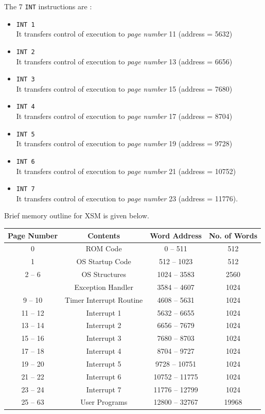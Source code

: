 \documentclass[11pt]{report}
\begin{document}
The 7 \texttt{INT} instructions are :
\begin{itemize}

\item \texttt{INT 1}  \\It transfers control of execution to \textit{page number} 11 (address = 5632)
\item \texttt{INT 2}  \\It transfers control of execution to \textit{page number} 13 (address = 6656)
\item \texttt{INT 3}  \\It transfers control of execution to \textit{page number} 15 (address = 7680)
\item \texttt{INT 4}  \\It transfers control of execution to \textit{page number} 17 (address = 8704)
\item \texttt{INT 5}  \\It transfers control of execution to \textit{page number} 19 (address = 9728)
\item \texttt{INT 6}  \\It transfers control of execution to \textit{page number}  21 (address = 10752)
\item \texttt{INT 7}  \\It transfers control of execution to \textit{page number} 23 (address = 11776).\
 
\end{itemize}

Brief memory outline for XSM is given below.
\begin{center}
\begin{tabular}{|c|c|c|c|}
\hline \textbf{Page Number} & \textbf{Contents} & \textbf{Word Address}  & \textbf{No. of Words} \\ 
\hline 0 & ROM Code &  0 -- 511 & 512 \\ 
1 & OS Startup Code & 512 -- 1023 & 512 \\ 
2 -- 6 & OS Structures  &  1024 -- 3583 & 2560 \\ 
 \rowcolor{gray!15}
\hline 7 & Exception Handler  &  3584 -- 4607 & 1024 \\ 
 \rowcolor{gray!15}
 9 -- 10 & Timer Interrupt Routine  &  4608 -- 5631 & 1024 \\ 
 \rowcolor{gray!15}
 11 -- 12 & Interrupt 1  &  5632 -- 6655 & 1024 \\ 
 \rowcolor{gray!15}
13 -- 14 & Interrupt 2  &  6656 -- 7679 & 1024 \\ 
 \rowcolor{gray!15}
 15 -- 16 & Interrupt 3  &  7680 -- 8703 & 1024 \\ 
 \rowcolor{gray!15}
 17 -- 18 & Interrupt 4  &  8704 -- 9727 & 1024 \\ 
 \rowcolor{gray!15}
 19 -- 20 & Interrupt 5  &  9728 -- 10751 & 1024 \\ 
 \rowcolor{gray!15}
 21 -- 22 & Interrupt 6  &  10752 -- 11775 & 1024 \\
 \rowcolor{gray!15} 
 23 -- 24 & Interrupt 7  &  11776 -- 12799 & 1024 \\ 
\hline 25 -- 63 & User Programs & 12800 -- 32767 & 19968 \\
\hline
\end{tabular} 
\end{center}
\end{document}

